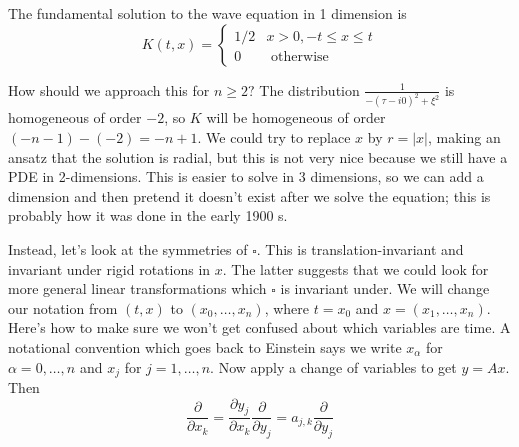 \begin{theorem}
    The fundamental solution to the wave equation in 1 dimension is
$$
K(t, x)= \begin{cases}1 / 2 & x>0,-t \leq x \leq t \\ 0 & \text { otherwise }\end{cases}
$$
\end{theorem}
How should we approach this for $n \geq 2 ?$ The distribution $\frac{1}{-(\tau-i 0)^{2}+\xi^{2}}$ is homogeneous of order $-2$, so $K$ will be homogeneous of order $(-n-1)-(-2)=-n+1$. We could try to replace $x$ by $r=|x|$, making an ansatz that the solution is radial, but this is not very nice because we still have a PDE in 2-dimensions. This is easier to solve in 3 dimensions, so we can add a dimension and then pretend it doesn't exist after we solve the equation; this is probably how it was done in the early 1900 s.

Instead, let's look at the symmetries of $\square$. This is translation-invariant and invariant under rigid rotations in $x$. The latter suggests that we could look for more general linear transformations which $\square$ is invariant under. We will change our notation from $(t, x)$ to $\left(x_{0}, \ldots, x_{n}\right)$, where $t=x_{0}$ and $x=\left(x_{1}, \ldots, x_{n}\right) .$ Here's how to make sure we won't get confused about which variables are time. A notational convention which goes back to Einstein says we write $x_{\alpha}$ for $\alpha=0, \ldots, n$ and $x_{j}$ for $j=1, \ldots, n$. Now apply a change of variables to get $y=A x$. Then
$$
\frac{\partial}{\partial x_{k}}=\frac{\partial y_{j}}{\partial x_{k}} \frac{\partial}{\partial y_{j}}=a_{j, k} \frac{\partial}{\partial y_{j}}
$$